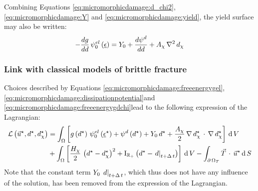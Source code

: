 Combining Equations \eqref{eq:micromorphicdamage:d_chi2},
\eqref{eq:micromorphicdamage:Y} and \eqref{eq:micromorphicdamage:yield}, the yield
surface may also be written:
%
%
%
\begin{equation}
  \label{eq:micromorphicdamage:damage_estimate}
  -\displaystyle \frac{\displaystyle dg}{\displaystyle dd}\,{\psi}^{el}_{0}\left(\underline{\epsilon}\right)=
  Y_{0}+\displaystyle \frac{\displaystyle d{\psi}^{d}}{\displaystyle dd}+A_{\chi}\,\nabla{}^2\,d_{\chi}
\end{equation}

\subsubsection{Link with classical models of brittle fracture}

Choices described by Equations \eqref{eq:micromorphicdamage:freeenergygel},
\eqref{eq:micromorphicdamage:dissipationpotential}and
\eqref{eq:micromorphicdamage:freeenergygdchi}lead to the following expression
of the Lagrangian:
%
%
%
\begin{equation}
  \label{eq:micromorphicdamage:Lagrangian}
  \begin{aligned}
  \mathcal{L}\left(\vec{u}^{\star},d^{\star},d_{\chi}^{\star}\right)
  &=\int_{\Omega}
  \left[
  g\left(d^{\star}\right)\,{\psi}^{el}_{0}\left(\underline{\epsilon}^{\star}\right)+
  {\psi}^{d}\left(d^{\star}\right)+
  Y_{0}\,d^{\star}
  +\displaystyle \frac{\displaystyle A_{\chi}}{\displaystyle 2}\,\nabla\, d_{\chi}^{\star}\,\cdot\,\nabla\, d_{\chi}^{\star}
  \right]
  \,\mathrm{d}\,V\\
  &+\int_{\Omega}
  \left[
  \displaystyle \frac{\displaystyle H_{\chi}}{\displaystyle 2}\,\left(d^{\star}-d_{\chi}^{\star}\right)^{2}+
  \mathrm{I}_{\mathbb{R}_{+}}\left(d^{\star}-\left.d\right|_{t+\Delta\,t}\right) 
  \right]
  \,\mathrm{d}\,V
  - \int_{\partial\,\Omega_{T}} \vec{T}\,\cdot\,\vec{u}^{\star} \,\mathrm{d}\,S
  \end{aligned}
\end{equation}
Note that the constant term \(Y_{0}\,\left.d\right|_{t+\Delta\,t}\), which thus does not have
any influence of the solution, has been removed from the expression of
the Lagrangian.

